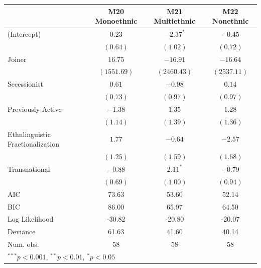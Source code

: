 \documentclass[12pt,]{book}
\let\origtable\table
\let\endorigtable\endtable
\renewenvironment{table}[1][2] {
    \singlespacing
    \expandafter\origtable\expandafter[H]
} {
    \endorigtable
}
\theoremstyle{definition}
\theoremstyle{definition}
\theoremstyle{definition}
\theoremstyle{remark}
\begin{document}
\begin{table}
\begin{center}
\begin{tabular}{l c c c }
\hline
 & M20 Monoethnic & M21 Multiethnic & M22 Nonethnic \\
\hline
(Intercept)                      & $0.23$      & $-2.37^{*}$ & $-0.45$     \\
                                 & $(0.64)$    & $(1.02)$    & $(0.72)$    \\
Joiner                           & $16.75$     & $-16.91$    & $-16.64$    \\
                                 & $(1551.69)$ & $(2460.43)$ & $(2537.11)$ \\
Secessionist                     & $0.61$      & $-0.98$     & $0.14$      \\
                                 & $(0.73)$    & $(0.97)$    & $(0.97)$    \\
Previously Active                & $-1.38$     & $1.35$      & $1.28$      \\
                                 & $(1.14)$    & $(1.39)$    & $(1.36)$    \\
Ethnlinguistic Fractionalization & $1.77$      & $-0.64$     & $-2.57$     \\
                                 & $(1.25)$    & $(1.59)$    & $(1.68)$    \\
Transnational                    & $-0.88$     & $2.11^{*}$  & $-0.79$     \\
                                 & $(0.69)$    & $(1.00)$    & $(0.94)$    \\
\hline
AIC                              & 73.63       & 53.60       & 52.14       \\
BIC                              & 86.00       & 65.97       & 64.50       \\
Log Likelihood                   & -30.82      & -20.80      & -20.07      \\
Deviance                         & 61.63       & 41.60       & 40.14       \\
Num. obs.                        & 58          & 58          & 58          \\
\hline
\multicolumn{4}{l}{\scriptsize{$^{***}p<0.001$, $^{**}p<0.01$, $^*p<0.05$}}
\end{tabular}
\caption{Logit Models of Rebel Group Ethnic Composition (Conflict-Years with > 1000 Fatalities)}
\label{tab:comp-war}
\end{center}
\end{table}
\end{document}
